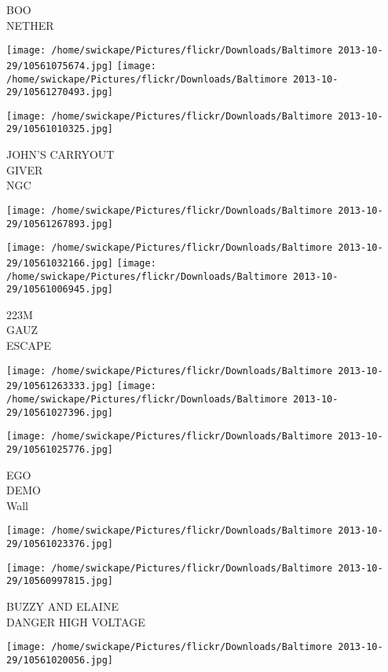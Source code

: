 \documentclass[10pt,letterpaper]{article}
\begin{document}
BOO\\
NETHER
\pagebreak

\texttt{[image: /home/swickape/Pictures/flickr/Downloads/Baltimore 2013-10-29/10561075674.jpg]}
\texttt{[image: /home/swickape/Pictures/flickr/Downloads/Baltimore 2013-10-29/10561270493.jpg]}

\texttt{[image: /home/swickape/Pictures/flickr/Downloads/Baltimore 2013-10-29/10561010325.jpg]}

JOHN'S CARRYOUT\\
GIVER\\
NGC
\pagebreak

\texttt{[image: /home/swickape/Pictures/flickr/Downloads/Baltimore 2013-10-29/10561267893.jpg]}

\vspace{0.25in}
\texttt{[image: /home/swickape/Pictures/flickr/Downloads/Baltimore 2013-10-29/10561032166.jpg]}
\texttt{[image: /home/swickape/Pictures/flickr/Downloads/Baltimore 2013-10-29/10561006945.jpg]}

223M\\
GAUZ\\
ESCAPE
\pagebreak

\texttt{[image: /home/swickape/Pictures/flickr/Downloads/Baltimore 2013-10-29/10561263333.jpg]}
\texttt{[image: /home/swickape/Pictures/flickr/Downloads/Baltimore 2013-10-29/10561027396.jpg]}

\vspace{0.25in}
\texttt{[image: /home/swickape/Pictures/flickr/Downloads/Baltimore 2013-10-29/10561025776.jpg]}

EGO\\
DEMO\\
Wall
\pagebreak

\texttt{[image: /home/swickape/Pictures/flickr/Downloads/Baltimore 2013-10-29/10561023376.jpg]}

\vspace{0.25in}
\texttt{[image: /home/swickape/Pictures/flickr/Downloads/Baltimore 2013-10-29/10560997815.jpg]}

BUZZY AND ELAINE\\
DANGER HIGH VOLTAGE
\pagebreak

\texttt{[image: /home/swickape/Pictures/flickr/Downloads/Baltimore 2013-10-29/10561020056.jpg]}
\end{document}
